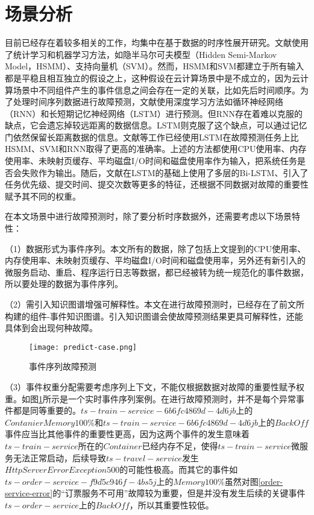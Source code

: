 \section{场景分析}\label{predict-analysis}
目前已经存在着较多相关的工作，均集中在基于数据的时序性展开研究。文献\parencite{pitakrat2018hora,zhang2018prefix,baldoni2015line}使用了统计学习和机器学习方法，如隐半马尔可夫模型（Hidden Semi-Markov Model，HSMM）、支持向量机（SVM）。然而，HSMM和SVM都建立于所有输入都是平稳且相互独立的假设之上，这种假设在云计算场景中是不成立的，因为云计算场景中不同组件产生的事件信息之间会存在一定的关联，比如先后时间顺序。为了处理时间序列数据进行故障预测，文献\parencite{xu2016health,cheng2018machine,du2017deeplog,das2018desh,islam2017predicting}使用深度学习方法如循环神经网络（RNN）和长短期记忆神经网络（LSTM）进行预测。但RNN存在着难以克服的缺点，它会遗忘掉较远距离的数据信息。LSTM则克服了这个缺点，可以通过记忆门依然保留长距离数据的信息。文献\parencite{cheng2018machine,du2017deeplog,das2018desh}等工作已经使用LSTM在故障预测任务上比HSMM、SVM和RNN取得了更高的准确率。上述的方法都使用CPU使用率、内存使用率、未映射页缓存、平均磁盘I/O时间和磁盘使用率作为输入，把系统任务是否会失败作为输出。随后，文献\parencite{gao2020task}在LSTM的基础上使用了多层的Bi-LSTM、引入了任务优先级、提交时间、提交次数等更多的特征，还根据不同数据对故障的重要性赋予其不同的权重。

在本文场景中进行故障预测时，除了要分析时序数据外，还需要考虑以下场景特性：

（1）数据形式为事件序列。本文所有的数据，除了包括上文提到的CPU使用率、内存使用率、未映射页缓存、平均磁盘I/O时间和磁盘使用率，另外还有新引入的微服务启动、重启、程序运行日志等数据，都已经被转为统一规范化的事件数据，所以要处理的数据为事件序列。

（2）需引入知识图谱增强可解释性。本文在进行故障预测时，已经存在了前文所构建的组件-事件知识图谱。引入知识图谱会使故障预测结果更具可解释性，还能具体到会出现何种故障。
\begin{figure}[htbp]
    \centering
    \texttt{[image: predict-case.png]}
    \caption{事件序列故障预测\label{predict-case}}
\end{figure}

（3）事件权重分配需要考虑序列上下文，不能仅根据数据对故障的重要性赋予权重。如图\ref{predict-case}所示是一个实时事件序列案例。在进行故障预测时，并不是每个异常事件都是同等重要的。$ts-train-service-6b6fc4869d-4d6jb$上的$Contanier Memory 100\%$和$ts-train-service-6b6fc4869d-4d6jb$上的$BackOff$事件应当比其他事件的重要性更高，因为这两个事件的发生意味着$ts-train-service$所在的$Container$已经内存不足，使得$ts-train-service$微服务无法正常启动，后续导致$ts-travel-service$发生$HttpServerErrorException 500$的可能性极高。而其它的事件如$ts-order-service-f9d5c946f-4bs5j$上的$Memory 100\%$虽然对图\ref{order-service-error}的“订票服务不可用”故障较为重要，但是并没有发生后续的关键事件$ts-order-service$上的$BackOff$，所以其重要性较低。

